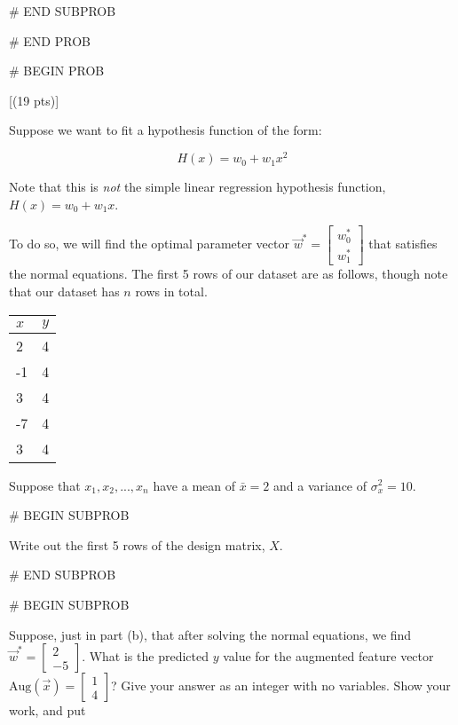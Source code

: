 \documentclass[twoside,12pt]{article}
\begin{document}
{%
    
% 

# END SUBPROB
    

    


# END PROB

\newpage

# BEGIN PROB

[(19 pts)]

Suppose we want to fit a hypothesis function of the form:

$$H(x) = w_0 + w_1 x^2$$

Note that this is \textit{not} the simple linear regression hypothesis function, $H(x) = w_0 + w_1x$.

To do so, we will find the optimal parameter vector $\vec{w}^* = \begin{bmatrix} w_0^* \\ w_1^* \end{bmatrix}$ that satisfies the normal equations. The first 5 rows of our dataset are as follows, though note that our dataset has $n$ rows in total.

\begin{table}[H]
\centering
\begin{tabular}{|l|l|}
\hline
$x$ & $y$ \\ \hline
2   & 4   \\ \hline
-1  & 4   \\ \hline
3   & 4  \\ \hline
-7  & 4   \\ \hline
3   & 4   \\ \hline
\end{tabular}
\end{table}

Suppose that $x_1, x_2, ..., x_n$ have a mean of $\bar{x} = 2$ and a variance of $\sigma_x^2 = 10$.



# BEGIN SUBPROB

 Write out the first 5 rows of the design matrix, $X$.

\begin{responsebox}{1.5in}
    
\end{responsebox}



# END SUBPROB

# BEGIN SUBPROB

 Suppose, just in part (b), that after solving the normal equations, we find $\vec{w}^* = \begin{bmatrix} 2 \\ -5 \end{bmatrix}$. What is the predicted $y$ value for the augmented feature vector $\text{Aug}(\vec{x}) =  \begin{bmatrix} 1 \\ 4 \end{bmatrix}$? Give your answer as an integer with no variables. Show your work, and put 

}
\end{document}
